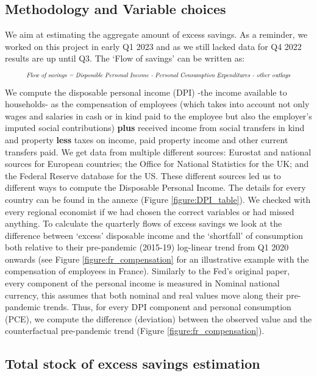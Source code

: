 \subsection{Methodology and Variable choices}
\quad We aim at estimating the aggregate amount of excess savings. As a reminder, we worked on this project in early Q1 2023 and as we still lacked data for Q4 2022 results are up until Q3. The ‘Flow of savings’ can be written as: 
\begin{align*}
    \resizebox{.9\hsize}{!}{\textit{\mbox{Flow of savings} = \mbox{Disposable Personal Income} - \mbox{Personal Consumption Expenditures} - \mbox{other outlays}}}
\end{align*}   
\vspace{-0.05cm}
We compute the disposable personal income (DPI) -the income available to households- as the compensation of employees (which takes into account not only wages and salaries in cash or in kind paid to the employee but also the employer’s imputed social contributions) \textbf{plus} received income from social transfers in kind and property \textbf{less} taxes on income, paid property income and other current transfers paid. 
We get data from multiple different sources: Eurostat and national sources for European countries; the Office for National Statistics for the UK; and the Federal Reserve database for the US. These different sources led us to different ways to compute the Disposable Personal Income. 
The details for every country can be found in the annexe (Figure \ref*{figure:DPI_table}). We checked with every regional economist if we had chosen the correct variables or had missed anything.
To calculate the quarterly flows of excess savings we look at the difference between ‘excess’ disposable income and the ‘shortfall’ of consumption both relative to their pre-pandemic (2015-19) log-linear trend from Q1 2020 onwards (see Figure \ref{figure:fr_compensation} for an illustrative example with the compensation of employees in France). 
Similarly to the Fed's original paper, every component of the personal income is measured in Nominal national currency, this assumes that both nominal and real values move along their pre-pandemic trends. 
Thus, for every DPI component and personal consumption (PCE), we compute the difference (deviation) between the observed value and the counterfactual pre-pandemic trend (Figure \ref{figure:fr_compensation}). 

\subsection{Total stock of excess savings estimation}

